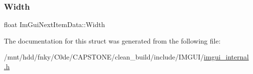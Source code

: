 \subsubsection{\texorpdfstring{Width}{Width}}
{\footnotesize\ttfamily float Im\+Gui\+Next\+Item\+Data\+::\+Width}



The documentation for this struct was generated from the following file\+:\begin{DoxyCompactItemize}
\item 
/mnt/hdd/fnky/\+C0de/\+C\+A\+P\+S\+T\+O\+N\+E/clean\+\_\+build/include/\+I\+M\+G\+U\+I/\hyperlink{imgui__internal_8h}{imgui\+\_\+internal.\+h}\end{DoxyCompactItemize}

